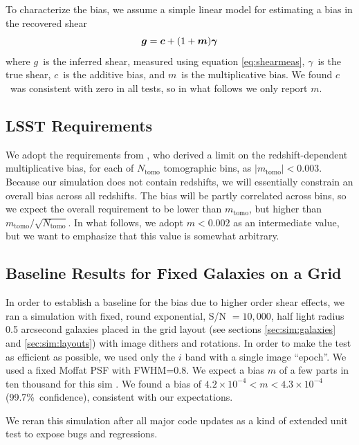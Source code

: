 \documentclass[twocolumn,twocolappendix,astrosym]{openjournal}
\newcommand{\vecg}{\mbox{\boldmath $g$}}
\newcommand{\vecc}{\mbox{\boldmath $c$}}
\newcommand{\vecm}{\mbox{\boldmath $m$}}
\newcommand{\vecgam}{\mbox{\boldmath $\gamma$}}
\begin{document}
To characterize the bias, we assume a simple linear model \citep[see,
e.g.,][]{heymans2006} for estimating a bias in the recovered shear
\begin{equation} \label{eq:m}
\vecg = \vecc + (1 + \vecm) \vecgam
\end{equation}
where \vecg\ is the inferred shear, measured using equation \ref{eq:shearmeas},
\vecgam\ is the true shear, \vecc\ is the additive bias, and \vecm\ is the
multiplicative bias. We found \vecc\ was consistent with zero in all tests, so
in what follows we only report \vecm.

\subsection{LSST Requirements} \label{sec:lsstreq}

We adopt the requirements from \cite{SRD}, who derived a limit on the
redshift-dependent multiplicative bias, for each of $N_{\mathrm{tomo}}$
tomographic bins, as $|m_{\mathrm{tomo}}| < 0.003$.  Because our simulation
does not contain redshifts, we will essentially constrain an overall bias
across all redshifts.  The bias will be partly correlated across bins, so we
expect the overall requirement to be lower than $m_{\mathrm{tomo}}$, but higher
than $m_{\mathrm{tomo}}/\sqrt{N_{\mathrm{tomo}}}$.  In what follows, we adopt
$m < 0.002$ as an intermediate value, but we want to emphasize that this value
is somewhat arbitrary.

\subsection{Baseline Results for Fixed Galaxies on a Grid} \label{sec:results:base}

In order to establish a baseline for the bias due to higher order shear
effects, we ran a simulation with fixed, round exponential, S/N $= 10,000$,
half light radius 0.5 arcsecond galaxies placed in the grid layout (see
sections \ref{sec:sim:galaxies} and \ref{sec:sim:layouts}) with image dithers
and rotations.  In order to make the test as efficient as possible, we used
only the $i$ band with a single image ``epoch''.  We used a fixed Moffat
PSF\citep{Moffat1969} with FWHM=0.8.  We expect a bias $m$ of a few parts in
ten thousand for this sim \citep{SheldonMcal2017}.  We found a bias of
$4.2\times 10^{-4} < m < 4.3\times 10^{-4}$ (99.7\%~confidence), consistent
with our expectations.

We reran this simulation after all major code updates as a kind of extended
unit test to expose bugs and regressions.
\end{document}
